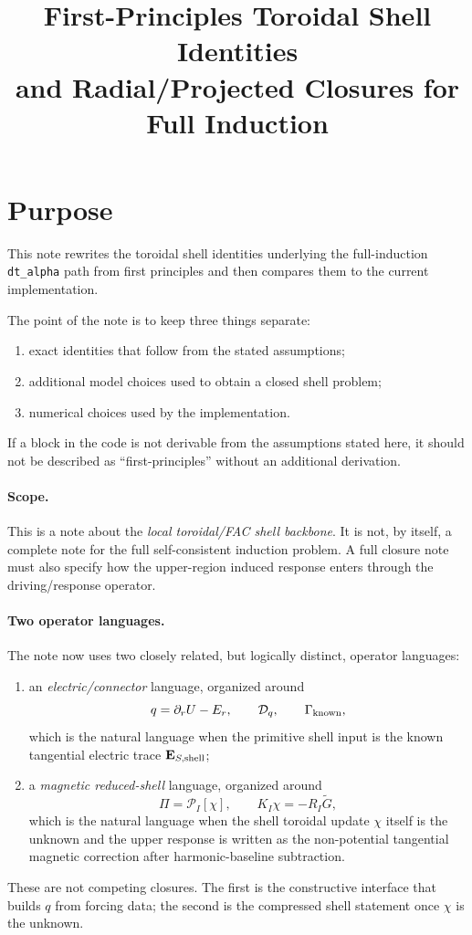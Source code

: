 \documentclass[11pt,a4paper]{article}
\title{First-Principles Toroidal Shell Identities\\
and Radial/Projected Closures for Full Induction}
\author{}
\date{}
\begin{document}
\maketitle

\section*{Purpose}

This note rewrites the toroidal shell identities underlying the full-induction
\texttt{dt\_alpha} path from first principles and then compares them to the
current implementation.

The point of the note is to keep three things separate:
\begin{enumerate}
\item exact identities that follow from the stated assumptions;
\item additional model choices used to obtain a closed shell problem;
\item numerical choices used by the implementation.
\end{enumerate}

If a block in the code is not derivable from the assumptions stated here, it
should not be described as ``first-principles'' without an additional derivation.

\paragraph{Scope.}
This is a note about the \emph{local toroidal/FAC shell backbone}. It is not, by
itself, a complete note for the full self-consistent induction problem. A full
closure note must also specify how the upper-region induced response enters
through the driving/response operator.

\paragraph{Two operator languages.}
The note now uses two closely related, but logically distinct, operator
languages:
\begin{enumerate}
\item an \emph{electric/connector} language, organized around
\[
q=\partial_r U-E_r,
\qquad
\mathcal D_q,
\qquad
\Gamma_{\rm known},
\]
which is the natural language when the primitive shell input is the
known tangential electric trace \(\mathbf E_{S,\rm shell}\);
\item a \emph{magnetic reduced-shell} language, organized around
\[
\Pi=\mathcal P_I[\chi],
\qquad
K_I \chi = -R_I \widetilde G,
\]
which is the natural language when the shell toroidal update \(\chi\) itself
is the unknown and the upper response is written as the non-potential
tangential magnetic correction after harmonic-baseline subtraction.
\end{enumerate}
These are not competing closures. The first is the constructive interface that
builds \(q\) from forcing data; the second is the compressed shell statement
once \(\chi\) is the unknown.
\end{document}
